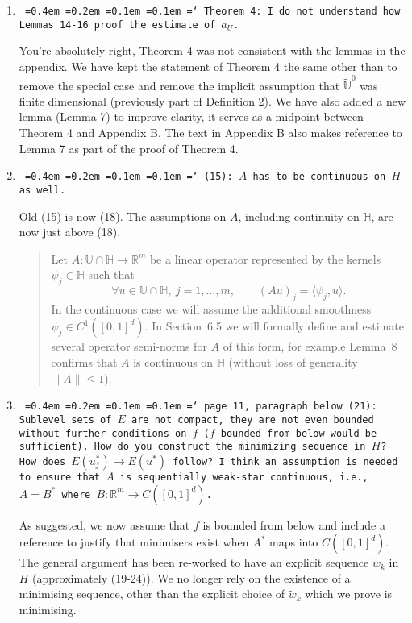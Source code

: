 \documentclass[12pt]{article}
\newcommand*\justify{%
	\fontdimen2\font=0.4em%
	\fontdimen3\font=0.2em%
	\fontdimen4\font=0.1em%
	\fontdimen7\font=0.1em%
	\hyphenchar\font=`\-%
}
\newcommand{\review}[1]{\texttt{\justify{#1}}}
\newcommand{\F}[1]{\mathbb{#1}}
\newcommand{\edit}[2]{{\color{red}\sout{#1}}{\color{darkgreen}#2}}
\begin{document}
\begin{enumerate}
	\item \review{Theorem 4: I do not understand how Lemmas 14-16 proof the estimate of $a_U$.}

	You're absolutely right, Theorem 4 was not consistent with the lemmas in the appendix. We have kept the statement of Theorem 4 the same other than to remove the special case and remove the implicit assumption that $\tilde{\F U}^0$ was finite dimensional (previously part of Definition 2). We have also added a new lemma (Lemma 7) to improve clarity, it serves as a midpoint between Theorem 4 and Appendix B. The text in Appendix B also makes reference to Lemma 7 as part of the proof of Theorem 4.
	
	\item \review{(15): $A$ has to be continuous on $H$ as well.}

	Old (15) is now (18). The assumptions on $A$, including continuity on $\F H$, are now just above (18).
	
	\begin{quote}
		\edit{}{Let $A\colon\F{U}\cap\F{H}\to\F R^m$ be a linear operator represented by the kernels $\psi_j\in\F{H}$ such that 
		\begin{equation*}\label{eq: kernels of A}
			\forall u\in\F{U}\cap\F{H},\ j=1,\ldots,m,\qquad (Au)_j = \langle \psi_j, u\rangle.
		\end{equation*}
		In the continuous case we will assume the additional smoothness $\psi_j\in C^1([0,1]^d)$. In Section~6.5 we will formally define and estimate several operator semi-norms for $A$ of this form, for example Lemma~8 confirms that $A$ is continuous on $\F{H}$ (without loss of generality $\|A\|\leq 1$).} 
	\end{quote}
	
	\item \review{page 11, paragraph below (21): Sublevel sets of $E$ are not compact, they are not even bounded without further conditions on $f$ ($f$ bounded from below would be sufficient). How do you construct the minimizing sequence in $H$? How does $E(u^*_j) \to E(u^*)$ follow? I think an assumption is needed to ensure that $A$ is sequentially weak-star continuous, i.e., $A = B^*$ where $B : \mathbb{R}^m \to C([0, 1]^d)$.}
	
	As suggested, we now assume that $f$ is bounded from below and include a reference to justify that minimisers exist when $A^*$ maps into $C([0,1]^d)$. The general argument has been re-worked to have an explicit sequence $\tilde w_k$ in $H$ (approximately (19-24)). We no longer rely on the existence of a minimising sequence, other than the explicit choice of $\tilde w_k$ which we prove is minimising.
	

\end{enumerate}
\end{document}
